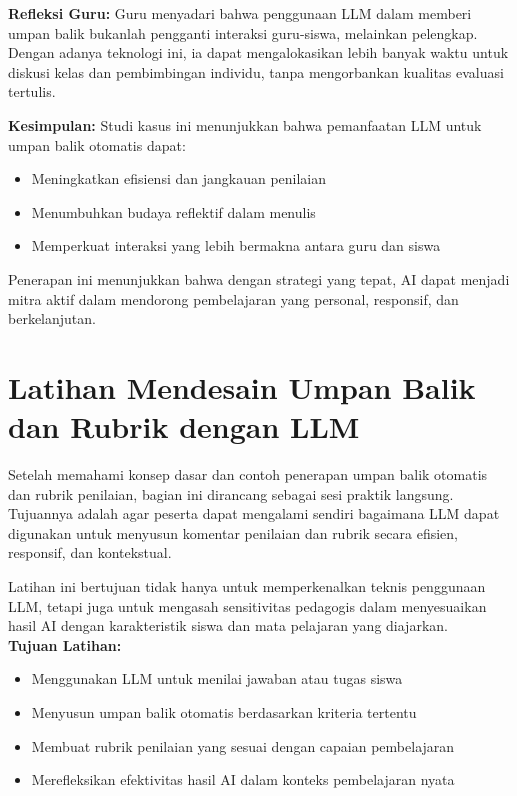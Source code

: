 \textbf{Refleksi Guru:}
Guru menyadari bahwa penggunaan LLM dalam memberi umpan balik bukanlah pengganti interaksi guru-siswa, melainkan pelengkap. Dengan adanya teknologi ini, ia dapat mengalokasikan lebih banyak waktu untuk diskusi kelas dan pembimbingan individu, tanpa mengorbankan kualitas evaluasi tertulis.

\textbf{Kesimpulan:}
Studi kasus ini menunjukkan bahwa pemanfaatan LLM untuk umpan balik otomatis dapat:
\begin{itemize}
	\item Meningkatkan efisiensi dan jangkauan penilaian
	\item Menumbuhkan budaya reflektif dalam menulis
	\item Memperkuat interaksi yang lebih bermakna antara guru dan siswa
\end{itemize}

Penerapan ini menunjukkan bahwa dengan strategi yang tepat, AI dapat menjadi mitra aktif dalam mendorong pembelajaran yang personal, responsif, dan berkelanjutan.

\section{Latihan Mendesain Umpan Balik dan Rubrik dengan LLM}

Setelah memahami konsep dasar dan contoh penerapan umpan balik otomatis dan rubrik penilaian, bagian ini dirancang sebagai sesi praktik langsung. Tujuannya adalah agar peserta dapat mengalami sendiri bagaimana LLM dapat digunakan untuk menyusun komentar penilaian dan rubrik secara efisien, responsif, dan kontekstual.

Latihan ini bertujuan tidak hanya untuk memperkenalkan teknis penggunaan LLM, tetapi juga untuk mengasah sensitivitas pedagogis dalam menyesuaikan hasil AI dengan karakteristik siswa dan mata pelajaran yang diajarkan.\\

\textbf{Tujuan Latihan:}
\begin{itemize}
	\item Menggunakan LLM untuk menilai jawaban atau tugas siswa
	\item Menyusun umpan balik otomatis berdasarkan kriteria tertentu
	\item Membuat rubrik penilaian yang sesuai dengan capaian pembelajaran
	\item Merefleksikan efektivitas hasil AI dalam konteks pembelajaran nyata\\
\end{itemize}

